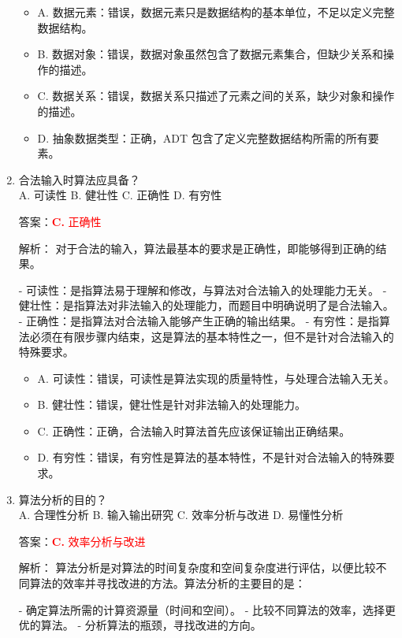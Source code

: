 \documentclass[lang=cn,newtx,10pt,scheme=chinese]{../../../elegantbook}
\begin{document}
\begin{enumerate}
    \begin{itemize}
        \item A. 数据元素：错误，数据元素只是数据结构的基本单位，不足以定义完整数据结构。
        \item B. 数据对象：错误，数据对象虽然包含了数据元素集合，但缺少关系和操作的描述。
        \item C. 数据关系：错误，数据关系只描述了元素之间的关系，缺少对象和操作的描述。
        \item D. 抽象数据类型：正确，ADT 包含了定义完整数据结构所需的所有要素。
    \end{itemize}

    \item 合法输入时算法应具备？\\
    A. 可读性 \quad B. 健壮性 \quad C. 正确性 \quad D. 有穷性

    答案：\textcolor{red}{\textbf{C.} 正确性}

    解析：
    对于合法的输入，算法最基本的要求是正确性，即能够得到正确的结果。
    
    - 可读性：是指算法易于理解和修改，与算法对合法输入的处理能力无关。
    - 健壮性：是指算法对非法输入的处理能力，而题目中明确说明了是合法输入。
    - 正确性：是指算法对合法输入能够产生正确的输出结果。
    - 有穷性：是指算法必须在有限步骤内结束，这是算法的基本特性之一，但不是针对合法输入的特殊要求。

    \begin{itemize}
        \item A. 可读性：错误，可读性是算法实现的质量特性，与处理合法输入无关。
        \item B. 健壮性：错误，健壮性是针对非法输入的处理能力。
        \item C. 正确性：正确，合法输入时算法首先应该保证输出正确结果。
        \item D. 有穷性：错误，有穷性是算法的基本特性，不是针对合法输入的特殊要求。
    \end{itemize}

    \item 算法分析的目的？\\
    A. 合理性分析 \quad B. 输入输出研究 \quad C. 效率分析与改进 \quad D. 易懂性分析

    答案：\textcolor{red}{\textbf{C.} 效率分析与改进}

    解析：
    算法分析是对算法的时间复杂度和空间复杂度进行评估，以便比较不同算法的效率并寻找改进的方法。算法分析的主要目的是：
    
    - 确定算法所需的计算资源量（时间和空间）。
    - 比较不同算法的效率，选择更优的算法。
    - 分析算法的瓶颈，寻找改进的方向。
    

\end{enumerate}
\end{document}
